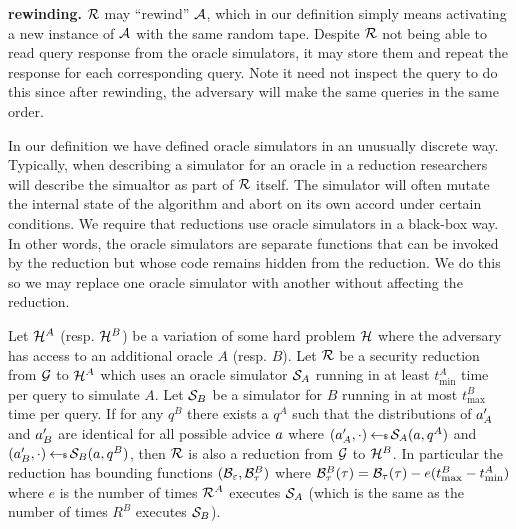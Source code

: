\begin{definition}
  \textbf{rewinding.} $\mathcal{R}$ may ``rewind'' $\mathcal{A}$, which in our definition simply means activating a new instance of $\mathcal{A}$ with the same random tape.
  Despite $\mathcal{R}$ not being able to read query response from the oracle simulators, it may store them and repeat the response for each corresponding query.
  Note it need not inspect the query to do this since after rewinding, the adversary will make the same queries in the same order.
\end{definition}


In our definition we have defined oracle simulators in an unusually discrete way.
Typically, when describing a simulator for an oracle in a reduction researchers will describe the simualtor as part of $\mathcal{R}$ itself.
The simulator will often mutate the internal state of the algorithm and abort on its own accord under certain conditions.
We require that reductions use oracle simulators in a black-box way.
In other words, the oracle simulators are separate functions that can be invoked by the reduction but whose code remains hidden from the reduction.
We do this so we may replace one oracle simulator with another without affecting the reduction.


\begin{lemma}
  \label{oracle-sub}
  Let $\mathcal{H}^A$ (resp. $\mathcal{H}^B$) be a variation of some hard problem $\mathcal{H}$ where the adversary has access to an additional oracle $A$ (resp. $B$).
  Let $\mathcal{R}$ be a security reduction from $\mathcal{G}$ to $\mathcal{H}^A$ which uses an oracle simulator $\mathcal{S}_A$ running in at least $t^A_{\min}$ time per query to simulate $A$.
  Let $\mathcal{S}_B$ be a simulator for $B$ running in at most $t^B_{\max}$ time per query.
  If for any $q^B$ there exists a $q^A$ such that the distributions of $a'_A$ and $a'_B$ are identical for all possible advice $a$ where $(a'_A, \cdot) \hskip2.3pt{\gets\!\!\mbox{\tiny${\$}$\normalsize}}\, \mathcal{S}_A(a, q^A)$ and $(a'_B, \cdot) \hskip2.3pt{\gets\!\!\mbox{\tiny${\$}$\normalsize}}\, \mathcal{S}_B(a, q^B)$,
  then $\mathcal{R}$ is also a reduction from $\mathcal{G}$ to $\mathcal{H}^B$.
  In particular the reduction has bounding functions $(\mathcal{B}_\varepsilon, \mathcal{B}^B_\tau)$ where $\mathcal{B}^B_\tau(\tau) = \mathcal{B}_\tau(\tau) - e(t^B_{\max} - t^A_{\min})$ where $e$ is the number of times $\mathcal{R}^A$ executes $\mathcal{S}_A$ (which is the same as the number of times $R^B$ executes $\mathcal{S}_B$).
\end{lemma}

